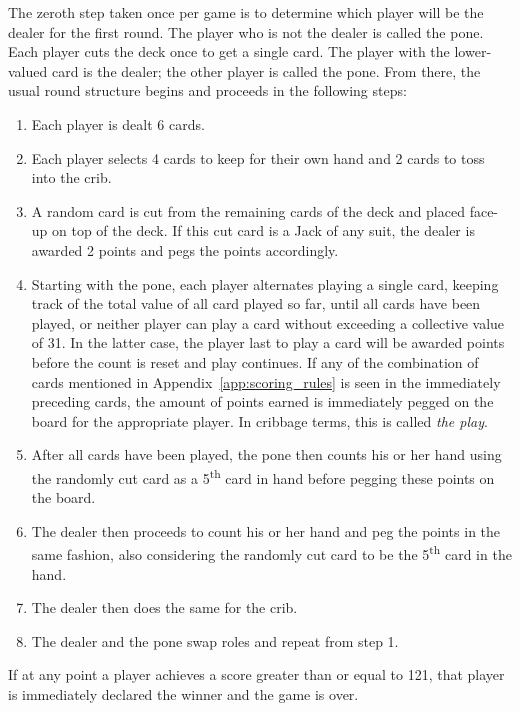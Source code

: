 The zeroth step taken once per game is to determine which player will be the
dealer for the first round.
%
The player who is not the dealer is called the pone.
%
Each player cuts the deck once to get a single card.
%
The player with the lower-valued card is the dealer;
the other player is called the pone.
%
From there, the usual round structure begins and proceeds in the following
steps:
%
\begin{enumerate}
%
\item Each player is dealt 6 cards.
%
\item Each player selects 4 cards to keep for their own hand and 2 cards to
	toss into the crib.
%
\item A random card is cut from the remaining cards of the deck and placed
	face-up on top of the deck.
	If this cut card is a Jack of any suit,
	the dealer is awarded 2 points and pegs the points accordingly.
%
\item Starting with the pone, each player alternates playing a single card,
	keeping track of the total value of all card played so far,
	until all cards have been played,
	or neither player can play a card without exceeding a collective value of
	31.
	In the latter case, the player last to play a card will be awarded points
	before the count is reset and play continues.
	If any of the combination of cards mentioned in
	Appendix~\ref{app:scoring_rules} is seen in the immediately preceding cards,
	the amount of points earned is immediately pegged on the board for the
	appropriate player.
	In cribbage terms, this is called \textit{the play}.
%
\item After all cards have been played,
	the pone then counts his or her hand using the randomly cut card as a
	5\textsuperscript{th} card in hand before pegging these points on the board.
%
\item The dealer then proceeds to count his or her hand and peg the points
	in the same fashion, also considering the randomly cut card to be the
	5\textsuperscript{th} card in the hand.
%
\item The dealer then does the same for the crib.
%
\item The dealer and the pone swap roles and repeat from step 1.
%
\end{enumerate}
%
If at any point a player achieves a score greater than or equal to 121,
that player is immediately declared the winner and the game is over.


